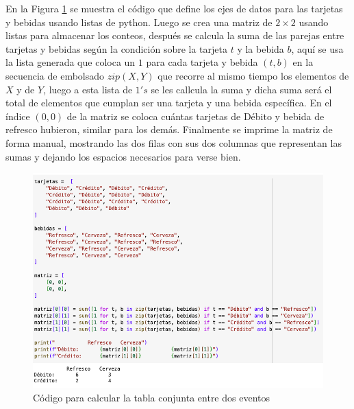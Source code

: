 \documentclass{article}
\begin{document}
\clearpage

\noindent
En la Figura \ref{fig:s202-1} se muestra el código que define los ejes de datos para las tarjetas y bebidas usando listas de python. Luego se crea una matriz de $2 \times 2$ usando listas para almacenar los conteos, después se calcula la suma de las parejas entre tarjetas y bebidas según la condición sobre la tarjeta $t$ y la bebida $b$, aquí se usa la lista generada que coloca un $1$ para cada tarjeta y bebida $(t, b)$ en la secuencia de embolsado $zip(X, Y)$ que recorre al mismo tiempo los elementos de $X$ y de $Y$, luego a esta lista de $1's$ se les callcula la suma y dicha suma será el total de elementos que cumplan ser una tarjeta y una bebida específica. En el índice $(0, 0)$ de la matriz se coloca cuántas tarjetas de Débito y bebida de refresco hubieron, similar para los demás. Finalmente se imprime la matriz de forma manual, mostrando las dos filas con sus dos columnas que representan las sumas y dejando los espacios necesarios para verse bien.
\begin{figure}[!ht]
    \centering
    \begin{minipage}{\textwidth}
        \centering
        \includegraphics[width=\textwidth]{figures/s202-1.png}
    \end{minipage}
    \captionsetup{width=0.9\textwidth}
    \caption{Código para calcular la tabla conjunta entre dos eventos}
    \label{fig:s202-1}
\end{figure}
\\
\end{document}

